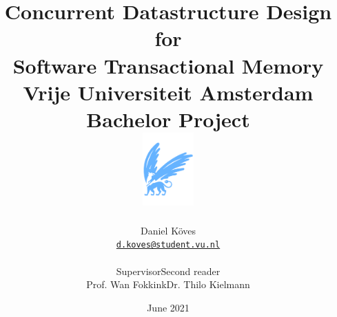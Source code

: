 \documentclass[12pt, a4paper, twoside]{report}
\begin{document}
\title{
{Concurrent Datastructure Design for\\ Software Transactional Memory} \\
\vspace{1cm}
{\large Vrije Universiteit Amsterdam} \\ 
{\large Bachelor Project} \\
\vspace{1.3cm}
{\includegraphics[height=28mm]{vu-griffioen.pdf}}}

\author{Daniel Köves \\
        \texttt{\href{mailto:d.koves@student.vu.nl}{d.koves@student.vu.nl}}\vspace*{0.5cm}\\
\setlength{\tabcolsep}{12pt}
\begin{tabular}{c c}
  {\normalsize Supervisor}   & {\normalsize Second reader}  \\
  {\normalsize Prof. Wan Fokkink}   & {\normalsize Dr. Thilo Kielmann}
\end{tabular}
}


\date{June 2021}

\maketitle

\tableofcontents

\listoffigures

\newpage
\end{document}
